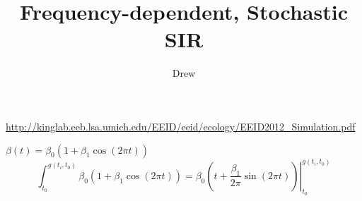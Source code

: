 \documentclass{article}
\title{Frequency-dependent, Stochastic SIR}
\author{Drew}
\begin{document}
\maketitle

\url{http://kinglab.eeb.lsa.umich.edu/EEID/eeid/ecology/EEID2012_Simulation.pdf}

$\beta(t)=\beta_0(1+\beta_1 \cos(2\pi t))$
\begin{equation}
  \int_{t_0}^{g(t_i,t_0)}\beta_0(1+\beta_1 \cos(2\pi t))=\left.\beta_0(t+\frac{\beta_1}{2\pi}\sin(2\pi t))\right|_{t_0}^{g(t_i,t_0)}
\end{equation}
\end{document}
